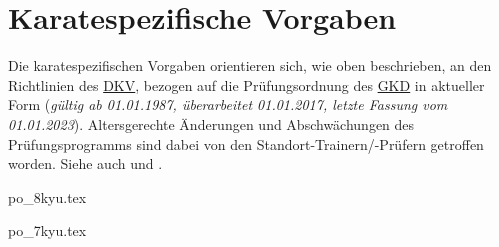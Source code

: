 	\vspace{12pt}
	\section{Karatespezifische Vorgaben}
		Die karatespezifischen Vorgaben orientieren sich, wie oben beschrieben, an den Richtlinien des \href{https://www.karate.de/}{DKV}, bezogen auf die Prüfungsordnung des \href{https://www.karate-gkd.de/}{GKD} in aktueller Form (\textit{gültig ab 01.01.1987, überarbeitet 01.01.2017, letzte Fassung vom 01.01.2023}). Altersgerechte Änderungen und Abschwächungen des Prüfungsprogramms sind dabei von den Standort-Trainern/-Prüfern getroffen worden. Siehe auch \cite{GKD2023} und \cite{DKV2024}.\vspace{24pt}\newline
		\begin{tcolorbox}[colback=white,colframe=YBELT,coltitle=black,title=8.\,Kyu: Gelb]
			{po_8kyu.tex}
		\end{tcolorbox}
	\vspace{24pt}
		\begin{tcolorbox}[colback=white,colframe=OBELT,coltitle=black,title=7.\,Kyu: Orange]
			{po_7kyu.tex}
		\end{tcolorbox}
